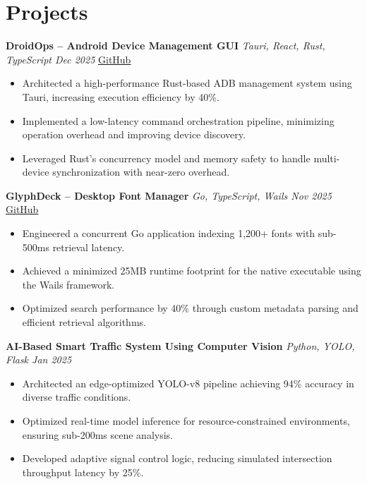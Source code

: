 \documentclass[a4paper,10pt]{article}
\begin{document}
\section*{Projects}

\textbf{DroidOps -- Android Device Management GUI} \hfill \textit{Tauri, React, Rust, TypeScript \quad Dec 2025} \quad \href{https://github.com/bbinxx/droidops}{GitHub}
\begin{itemize}
\item Architected a high-performance Rust-based ADB management system using Tauri, increasing execution efficiency by 40\%.
\item Implemented a low-latency command orchestration pipeline, minimizing operation overhead and improving device discovery.
\item Leveraged Rust's concurrency model and memory safety to handle multi-device synchronization with near-zero overhead.
\end{itemize}

\vspace{2pt}

\textbf{GlyphDeck -- Desktop Font Manager} \hfill \textit{Go, TypeScript, Wails \quad Nov 2025} \quad \href{https://github.com/bbinxx/GlyphDeck}{GitHub}
\begin{itemize}
\item Engineered a concurrent Go application indexing 1,200+ fonts with sub-500ms retrieval latency.
\item Achieved a minimized 25MB runtime footprint for the native executable using the Wails framework.
\item Optimized search performance by 40\% through custom metadata parsing and efficient retrieval algorithms.
\end{itemize}

\vspace{2pt}

\textbf{AI-Based Smart Traffic System Using Computer Vision} \hfill \textit{Python, YOLO, Flask \quad Jan 2025}
\begin{itemize}
\item Architected an edge-optimized YOLO-v8 pipeline achieving 94\% accuracy in diverse traffic conditions.
\item Optimized real-time model inference for resource-constrained environments, ensuring sub-200ms scene analysis.
\item Developed adaptive signal control logic, reducing simulated intersection throughput latency by 25\%.
\end{itemize}
\end{document}
